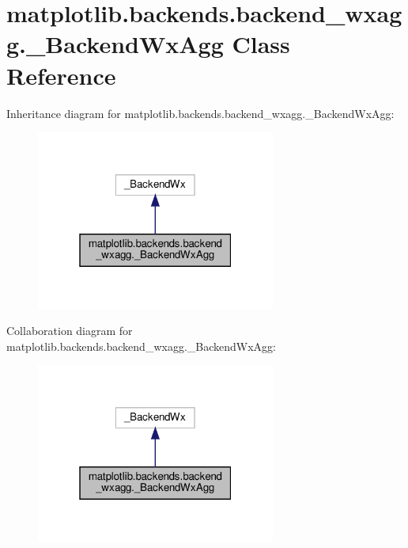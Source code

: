 \hypertarget{classmatplotlib_1_1backends_1_1backend__wxagg_1_1__BackendWxAgg}{}\section{matplotlib.\+backends.\+backend\+\_\+wxagg.\+\_\+\+Backend\+Wx\+Agg Class Reference}
\label{classmatplotlib_1_1backends_1_1backend__wxagg_1_1__BackendWxAgg}


Inheritance diagram for matplotlib.\+backends.\+backend\+\_\+wxagg.\+\_\+\+Backend\+Wx\+Agg\+:
\nopagebreak
\begin{figure}[H]
\begin{center}
\leavevmode
\includegraphics[width=223pt]{classmatplotlib_1_1backends_1_1backend__wxagg_1_1__BackendWxAgg__inherit__graph}
\end{center}
\end{figure}


Collaboration diagram for matplotlib.\+backends.\+backend\+\_\+wxagg.\+\_\+\+Backend\+Wx\+Agg\+:
\nopagebreak
\begin{figure}[H]
\begin{center}
\leavevmode
\includegraphics[width=223pt]{classmatplotlib_1_1backends_1_1backend__wxagg_1_1__BackendWxAgg__coll__graph}
\end{center}
\end{figure}
